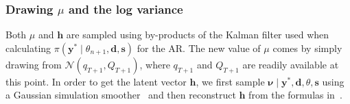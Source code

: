 \subsubsection{Drawing $\mu$ and the log variance}

Both $\mu$ and $\bm h$ are sampled using by-products of the Kalman filter used when calculating $\pi(\bm{y}^\ast\mid\theta_{n+1},\bm{d},\bm s)$ for the AR.
The new value of $\mu$ comes by simply drawing from $\mathcal{N}(q_{T+1},Q_{T+1})$, where $q_{T+1}$ and $Q_{T+1}$ are readily available at this point.
In order to get the latent vector $\bm h$, we first sample $\bm{\nu}\mid\bm{y}^\ast,\bm{d},\theta,\bm s$ using a Gaussian simulation smoother~\citep{fruhwirth1994data,carter1994gibbs} and then reconstruct $\bm h$ from the formulas in~\citet{de1995simulation}.


